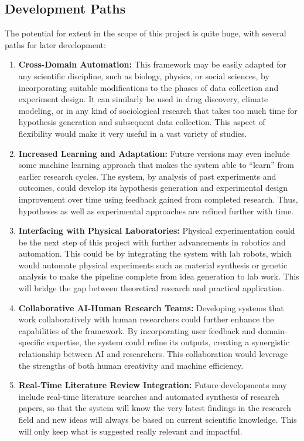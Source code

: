 \subsection{Development Paths}
The potential for extent in the scope of this project is quite huge, with several paths for later development:
\begin{enumerate}
    \item \textbf{Cross-Domain Automation:}
    This framework may be easily adapted for any scientific discipline, such as biology, physics, or social sciences, by incorporating suitable modifications to the phases of data collection and experiment design. It can similarly be used in drug discovery, climate modeling, or in any kind of sociological research that takes too much time for hypothesis generation and subsequent data collection. This aspect of flexibility would make it very useful in a vast variety of studies.
    
    \item \textbf{Increased Learning and Adaptation:}
    Future versions may even include some machine learning approach that makes the system able to ``learn'' from earlier research cycles. The system, by analysis of past experiments and outcomes, could develop its hypothesis generation and experimental design improvement over time using feedback gained from completed research. Thus, hypotheses as well as experimental approaches are refined further with time.
    
    \item \textbf{Interfacing with Physical Laboratories:}
    Physical experimentation could be the next step of this project with further advancements in robotics and automation. This could be by integrating the system with lab robots, which would automate physical experiments such as material synthesis or genetic analysis to make the pipeline complete from idea generation to lab work. This will bridge the gap between theoretical research and practical application.
    
    \item \textbf{Collaborative AI-Human Research Teams:}
    Developing systems that work collaboratively with human researchers could further enhance the capabilities of the framework. By incorporating user feedback and domain-specific expertise, the system could refine its outputs, creating a synergistic relationship between AI and researchers. This collaboration would leverage the strengths of both human creativity and machine efficiency.
    
    \item \textbf{Real-Time Literature Review Integration:}
    Future developments may include real-time literature searches and automated synthesis of research papers, so that the system will know the very latest findings in the research field and new ideas will always be based on current scientific knowledge. This will only keep what is suggested really relevant and impactful.
    \end{enumerate}

